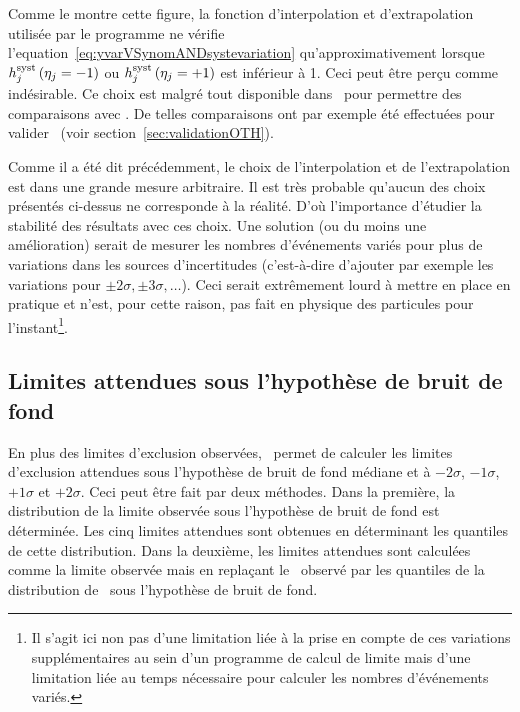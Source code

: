 Comme le montre cette figure, 
la fonction d'interpolation et d'extrapolation utilis\'ee par le programme \mclimit{} ne v\'erifie l'equation~\ref{eq:yvarVSynomANDsystevariation} qu'approximativement lorsque $\fsyst_j\left(\eta_j=-1\right)$ ou $\fsyst_j\left(\eta_j=+1\right)$ est inf\'erieur \`a 1.
Ceci peut \^etre per\c cu comme ind\'esirable. Ce choix est malgr\'e tout disponible dans \opthylic~pour permettre des comparaisons avec \mclimit. De telles comparaisons ont par exemple \'et\'e effectu\'ees pour valider \opthylic~(voir section~\ref{sec:validationOTH}).

Comme il a \'et\'e dit pr\'ec\'edemment, le choix de l'interpolation et de l'extrapolation est dans une grande mesure arbitraire. Il est tr\`es probable qu'aucun des choix pr\'esent\'es ci-dessus ne corresponde \`a la r\'ealit\'e. D'o\`u l'importance d'\'etudier la stabilit\'e des r\'esultats avec ces choix. Une solution (ou du moins une am\'elioration) serait de mesurer les nombres d'événements variés pour plus de variations dans les sources d'incertitudes (c'est-\`a-dire d'ajouter par exemple les variations pour $\pm 2\sigma,\pm 3\sigma,\hdots$). Ceci serait extr\^emement lourd \`a mettre en place en pratique et n'est, pour cette raison, pas fait en physique des particules pour l'instant\footnote{Il s'agit ici non pas d'une limitation li\'ee \`a la prise en compte de ces variations suppl\'ementaires au sein d'un programme de calcul de limite mais d'une limitation li\'ee au temps n\'ecessaire pour calculer les nombres d'\'ev\'enements vari\'es.}.

\subsection{Limites attendues sous l'hypoth\`ese de bruit de fond}
\label{sec:limitesAttenduesHypBdf}

En plus des limites d'exclusion observ\'ees, \opthylic~permet de calculer les limites d'exclusion attendues sous l'hypoth\`ese de bruit de fond m\'ediane et \`a $-2\sigma$, $-1\sigma$, $+1\sigma$ et $+2\sigma$. Ceci peut \^etre fait par deux méthodes. Dans la premi\`ere, la distribution de la limite observ\'ee sous l'hypoth\`ese de bruit de fond est d\'etermin\'ee. Les cinq limites attendues sont obtenues en d\'eterminant les quantiles de cette distribution. Dans la deuxi\`eme, les limites attendues sont calcul\'ees comme la limite observ\'ee mais en repla\c cant le \CLs~observ\'e par les quantiles de la distribution de \CLs~sous l'hypoth\`ese de bruit de fond.

